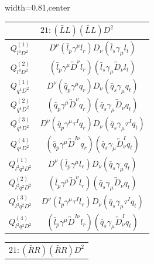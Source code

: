 
\begin{table}[H]
\begin{center}
\begin{adjustbox}{width=0.81\textwidth,center}
\small
\begin{minipage}[t]{5.1cm}
\renewcommand{\arraystretch}{1.5}
\begin{tabular}[t]{c|c}
\multicolumn{2}{c}{\boldmath$21:(\bar L L)(\bar L L)D^2$} \\
\hline
$Q_{l^4D^2}^{(1)}$  &  $D^\nu (\bar l_p \gamma^\mu l_r) D_\nu (\bar l_s \gamma_\mu l_t)$  \\
%
$Q_{l^4D^2}^{(2)}$  &  $(\bar l_p \gamma^\mu \overleftrightarrow{D}^\nu l_r) (\bar l_s \gamma_\mu \overleftrightarrow{D}_\nu l_t)$ \\
%
$Q_{q^4D^2}^{(1)}$  &  $D^\nu (\bar q_p \gamma^\mu q_r) D_\nu (\bar q_s \gamma_\mu q_t)$  \\
%
$Q_{q^4D^2}^{(2)}$  &  $(\bar q_p \gamma^\mu \overleftrightarrow{D}^\nu q_r) (\bar q_s \gamma_\mu \overleftrightarrow{D}_\nu q_t)$ \\
%
$Q_{q^4D^2}^{(3)}$  &  $D^\nu (\bar q_p \gamma^\mu \tau^I q_r) D_\nu (\bar q_s \gamma_\mu \tau^I q_t)$  \\
%
$Q_{q^4D^2}^{(4)}$  &  $(\bar q_p \gamma^\mu \overleftrightarrow{D}^{I\nu} q_r) (\bar q_s \gamma_\mu \overleftrightarrow{D}^I_\nu q_t)$ \\
%
$Q_{l^2q^2D^2}^{(1)}$  &  $D^\nu (\bar l_p \gamma^\mu l_r) D_\nu (\bar q_s \gamma_\mu q_t)$  \\
%
$Q_{l^2q^2D^2}^{(2)}$  &  $(\bar l_p \gamma^\mu \overleftrightarrow{D}^\nu l_r) (\bar q_s \gamma_\mu \overleftrightarrow{D}_\nu q_t)$ \\
%
$Q_{l^2q^2D^2}^{(3)}$  &  $D^\nu (\bar l_p \gamma^\mu \tau^I l_r) D_\nu (\bar q_s \gamma_\mu \tau^I q_t)$  \\
%
$Q_{l^2q^2D^2}^{(4)}$  &  $(\bar l_p \gamma^\mu \overleftrightarrow{D}^{I\nu} l_r) (\bar q_s \gamma_\mu \overleftrightarrow{D}^I_\nu q_t)$
\end{tabular}
\end{minipage}
\hspace{1cm}
\begin{minipage}[t]{6.1cm}
\renewcommand{\arraystretch}{1.5}
\begin{tabular}[t]{c|c}
\multicolumn{2}{c}{\boldmath$21:(\bar R R)(\bar R R)D^2$} \\

\end{tabular}
\end{minipage}
\end{adjustbox}
\end{center}
\end{table}
